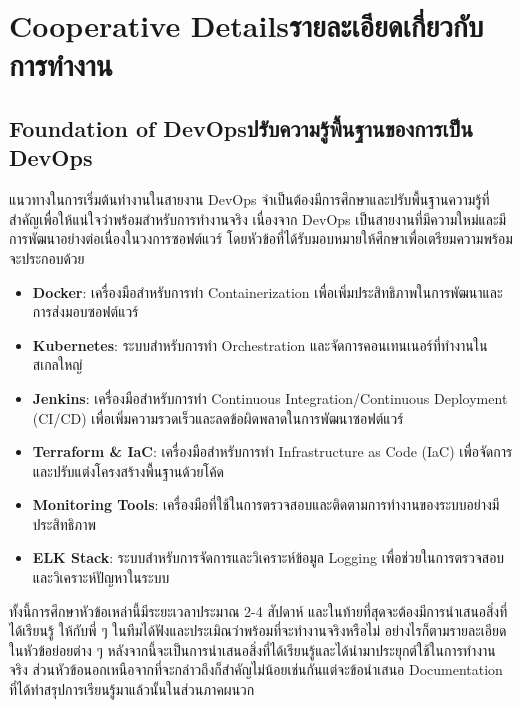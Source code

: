 

\setcounter{secnumdepth}{3}

\chapter{\ifenglish Cooperative Details\else รายละเอียดเกี่ยวกับการทำงาน\fi}


\section{\ifenglish Foundation of DevOps\else ปรับความรู้พื้นฐานของการเป็น DevOps\fi}
แนวทางในการเริ่มต้นทำงานในสายงาน DevOps จำเป็นต้องมีการศึกษาและปรับพื้นฐานความรู้ที่สำคัญเพื่อให้แน่ใจว่าพร้อมสำหรับการทำงานจริง
เนื่องจาก DevOps เป็นสายงานที่มีความใหม่และมีการพัฒนาอย่างต่อเนื่องในวงการซอฟต์แวร์ โดยหัวข้อที่ได้รับมอบหมายให้ศึกษาเพื่อเตรียมความพร้อมจะประกอบด้วย

\begin{itemize}
      \item \textbf{Docker}: เครื่องมือสำหรับการทำ Containerization เพื่อเพิ่มประสิทธิภาพในการพัฒนาและการส่งมอบซอฟต์แวร์
      \item \textbf{Kubernetes}: ระบบสำหรับการทำ Orchestration และจัดการคอนเทนเนอร์ที่ทำงานในสเกลใหญ่
      \item \textbf{Jenkins}: เครื่องมือสำหรับการทำ Continuous Integration/Continuous Deployment (CI/CD) เพื่อเพิ่มความรวดเร็วและลดข้อผิดพลาดในการพัฒนาซอฟต์แวร์
      \item \textbf{Terraform \& IaC}: เครื่องมือสำหรับการทำ Infrastructure as Code (IaC) เพื่อจัดการและปรับแต่งโครงสร้างพื้นฐานด้วยโค้ด
      \item \textbf{Monitoring Tools}: เครื่องมือที่ใช้ในการตรวจสอบและติดตามการทำงานของระบบอย่างมีประสิทธิภาพ
      \item \textbf{ELK Stack}: ระบบสำหรับการจัดการและวิเคราะห์ข้อมูล Logging เพื่อช่วยในการตรวจสอบและวิเคราะห์ปัญหาในระบบ
\end{itemize}

ทั้งนี้การศึกษาหัวข้อเหล่านี้มีระยะเวลาประมาณ 2-4 สัปดาห์ และในท้ายที่สุดจะต้องมีการนำเสนอสิ่งที่ได้เรียนรู้
ให้กับพี่ ๆ ในทีมได้ฟังและประเมิณว่าพร้อมที่จะทำงานจริงหรือไม่ อย่างไรก็ตามรายละเอียดในหัวข้อย่อยต่าง ๆ หลังจากนี้จะเป็นการนำเสนอสิ่งที่ได้เรียนรู้และได้นำมาประยุกต์ใช้ในการทำงานจริง
ส่วนหัวข้อนอกเหนือจากที่จะกล่าวถึงก็สำคัญไม่น้อยเช่นกันแต่จะข้อนำเสนอ Documentation ที่ได้ทำสรุปการเรียนรู้มาแล้วนั้นในส่วนภาคผนวก

